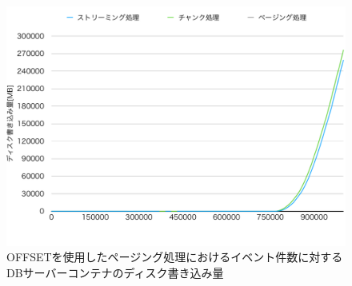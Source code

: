 \documentclass[../../../../../main]{subfiles}
\begin{document}
    \begin{figure}[H]
        \centering
        \includegraphics[width=12cm]{graph}
        \caption{OFFSETを使用したページング処理におけるイベント件数に対するDBサーバーコンテナのディスク書き込み量}
        \label{fig:each-way-db-disk-in-app_1_1024-db_1_1024}
    \end{figure}
\end{document}
